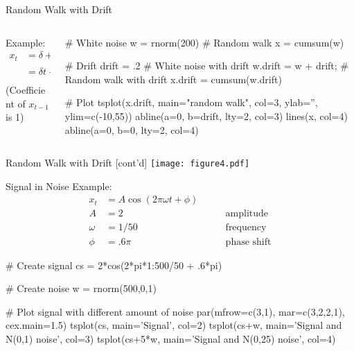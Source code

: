 \documentclass[ignorenonframetext,xcolor=x11names]{beamer}
\begin{document}
\begin{frame}[fragile]{Random Walk with Drift}
\begin{columns}
\begin{column}{.4\textwidth}
Example:
\begin{align*}x_t &= \delta + x_{t-1} + w_t \\
&= \delta t + \sum_{j=1}^t w_j\end{align*}
(Coefficient of $x_{t-1}$ is 1)
\end{column}
\begin{column}{.7\textwidth}
\begin{Rcode}
# White noise
w = rnorm(200)
# Random walk
x = cumsum(w)

# Drift
drift = .2
# White noise with drift
w.drift = w + drift;
# Random walk with drift
x.drift = cumsum(w.drift)

# Plot
tsplot(x.drift, main="random walk", col=3, 
       ylab='', ylim=c(-10,55))
abline(a=0, b=drift, lty=2, col=3)
lines(x, col=4)
abline(a=0, b=0, lty=2, col=4)
\end{Rcode}
\end{column}
\end{columns}
\end{frame}

\begin{frame}{Random Walk with Drift \small [cont'd]}
\texttt{[image: figure4.pdf]}
\end{frame}

\begin{frame}[fragile]{Signal in Noise}
Example:
\begin{align*}
x_t &= A \cos (2 \pi \omega t + \phi) \\
A &= 2 &\qquad \text{amplitude} \\
\omega &= 1/50 &\qquad \text{frequency} \\
\phi &= .6 \pi &\qquad \text{phase shift}
\end{align*}

\vspace{-1.5\baselineskip}
\begin{Rcode}
# Create signal
cs = 2*cos(2*pi*1:500/50 + .6*pi)

# Create noise
w = rnorm(500,0,1)

# Plot signal with different amount of noise
par(mfrow=c(3,1), mar=c(3,2,2,1), cex.main=1.5)
tsplot(cs, main='Signal', col=2)
tsplot(cs+w, main='Signal and N(0,1) noise', col=3)
tsplot(cs+5*w, main='Signal and N(0,25) noise', col=4)
\end{Rcode}
\end{frame}
\end{document}
